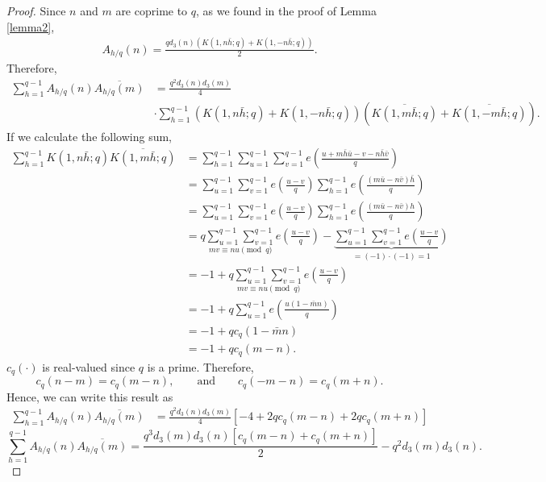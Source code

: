 \documentclass[oneside,reqno,10pt]{amsart}
\numberwithin{equation}{section}
\theoremstyle{plain}
\theoremstyle{definition}
\numberwithin{equation}{section}
\begin{document}
\begin{proof}
    Since $n$ and $m$ are coprime to $q$, as we found in the proof of Lemma \ref{lemma2},
    \begin{align*}
        A_{h/q}(n)=\frac{qd_3(n)(K(1,n\bar h;q)+K(1,-n\bar h;q))}{2}.
    \end{align*}
     Therefore,
\begin{align*}
    \sum\limits_{h=1}^{q-1}A_{h/q}(n)\overline{A_{h/q}(m)}&=\frac{q^2d_3(n)d_3(m)}{4}\\
    &\cdot \sum_{h=1}^{q-1}(K(1,n\bar h;q)+K(1,-n\bar h;q))(\overline{K(1,m\bar h;q)}+\overline{K(1,-m\bar h;q)}).
\end{align*} 
     If we calculate the following sum,
    \begin{align*}
        \sum_{h=1}^{q-1}K(1,n\bar h;q)\overline{K(1,m\bar h;q)}&=\sum_{h=1}^{q-1}\sum_{u=1}^{q-1}\sum_{v=1}^{q-1}e\left(\frac{u+m\bar h\bar  u-v-n\bar h\bar v}{q}\right)\\
        &=\sum_{u=1}^{q-1}\sum_{v=1}^{q-1}e\left(\frac{u-v}{q}\right)\sum_{h=1}^{q-1}e\left(\frac{(m\bar u-n\bar v)\bar h}{q}\right)\\
        &=\sum_{u=1}^{q-1}\sum_{v=1}^{q-1}e\left(\frac{u-v}{q}\right)\sum_{h=1}^{q-1}e\left(\frac{(m\bar u-n\bar v) h}{q}\right)\\
        &=q\underset{mv\equiv nu\pmod{q}}{\sum_{u=1}^{q-1}\sum_{v=1}^{q-1}}e\left(\frac{u-v}{q}\right)-\underset{=(-1)\cdot (-1)=1}{\underbrace{\sum_{u=1}^{q-1}\sum_{v=1}^{q-1}e\left(\frac{u-v}{q}\right)}}\\
        &=-1+q\underset{mv\equiv nu\pmod{q}}{\sum_{u=1}^{q-1}\sum_{v=1}^{q-1}}e\left(\frac{u-v}{q}\right)\\
        &=-1+q\sum_{u=1}^{q-1}e\left(\frac{u(1-\bar m n) }{q}\right)\\
        &=-1+qc_q(1-\bar{m}n)\\
        &=-1+qc_q(m-n).
    \end{align*} $c_q(\cdot)$ is real-valued since $q$ is a prime. Therefore, $$c_q(n-m)=c_q(m-n),\qquad \text{and}\qquad c_q(-m-n)=c_q(m+n).$$ Hence, we can write this result as
    \begin{align*}
        \sum\limits_{h=1}^{q-1}A_{h/q}(n)\overline{A_{h/q}(m)}&=\frac{q^2d_3(n)d_3(m)}{4}\left[-4+2qc_q(m-n)+2qc_q(m+n)\right]
    \end{align*}
    $$\sum\limits_{h=1}^{q-1}A_{h/q}(n)\overline{A_{h/q}(m)}=\frac{q^3d_3(m)d_3(n)\left[c_q(m-n)+c_q(m+n)\right]}{2}-q^2d_3(m)d_3(n).$$
\end{proof}
\end{document}
